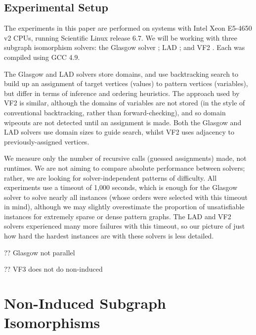 \documentclass[twoside,11pt]{article}
\newcommand{\citet}[1]{\citeA{#1}}
\newcommand{\citep}[1]{\cite{#1}}
\begin{document}
\subsection{Experimental Setup}

The experiments in this paper are performed on systems with Intel Xeon E5-4650 v2 CPUs, running
Scientific Linux release 6.7. We will be working with three subgraph isomorphism solvers: the
Glasgow solver \citet{DBLP:conf/cp/McCreeshP15}; LAD \citep{DBLP:journals/ai/Solnon10}; and VF2
\citep{DBLP:journals/pami/CordellaFSV04}. Each was compiled using GCC 4.9.

The Glasgow and LAD solvers store domains, and use backtracking search to build up an assignment of
target vertices (values) to pattern vertices (variables), but differ in terms of inference and
ordering heuristics.  The approach used by VF2 is similar, although the domains of variables are not
stored (in the style of conventional backtracking, rather than forward-checking), and so domain
wipeouts are not detected until an assignment is made. Both the Glasgow and LAD solvers use domain
sizes to guide search, whilst VF2 uses adjacency to previously-assigned vertices.

We measure only the number of recursive calls (guessed assignments) made, not
runtimes. We are not aiming to compare absolute performance between solvers; rather, we are looking
for solver-independent patterns of difficulty. All experiments use a timeout of 1,000 seconds, which
is enough for the Glasgow solver to solve nearly all instances (whose orders were selected with this
timeout in mind), although we may slightly overestimate the proportion of unsatisfiable instances
for extremely sparse or dense pattern graphs. The LAD and VF2 solvers experienced many more failures
with this timeout, so our picture of just how hard the hardest instances are with these solvers is
less detailed.

?? Glasgow not parallel

?? VF3 does not do non-induced

\section{Non-Induced Subgraph Isomorphisms}
\end{document}

